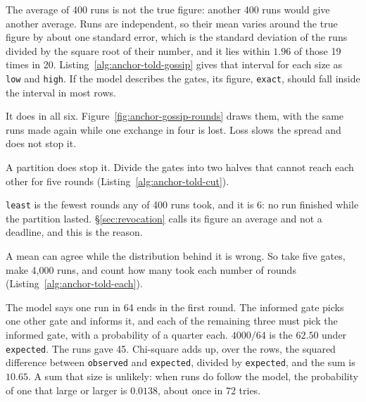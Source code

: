 The average of 400 runs is not the true figure: another 400 runs would
give another average. Runs are independent, so their mean varies around
the true figure by about one standard error, which is the standard
deviation of the runs divided by the square root of their number, and it
lies within $1.96$ of those 19 times in 20.
Listing~\ref{alg:anchor-told-gossip}
gives that interval for each size as \texttt{low} and \texttt{high}. If the
model describes the gates, its figure, \texttt{exact}, should fall inside
the interval in most rows.


It does in all six. Figure~\ref{fig:anchor-gossip-rounds} draws them,
with the same runs made again while one exchange in four is lost. Loss
slows the spread and does not stop it.



A partition does stop it. Divide the gates into two halves that cannot
reach each other for five rounds (Listing~\ref{alg:anchor-told-cut}).


\texttt{least} is the fewest rounds any of 400 runs took, and it is 6:
no run finished while the partition lasted. \S\ref{sec:revocation} calls
its figure an average and not a deadline, and this is the reason.

A mean can agree while the distribution behind it is wrong. So take five
gates, make 4{,}000 runs, and count how many took each number of rounds
(Listing~\ref{alg:anchor-told-each}).


The model says one run in 64 ends in the first round. The informed gate
picks one other gate and informs it, and each of the remaining three must
pick the informed gate, with a probability of a quarter each. $4000/64$ is
the $62.50$ under \texttt{expected}. The runs gave 45. Chi-square adds up,
over the rows, the squared difference between \texttt{observed} and
\texttt{expected}, divided by \texttt{expected}, and the sum is $10.65$. A
sum that size is unlikely: when runs do follow the model, the probability
of one that large or larger is $0.0138$, about once in 72 tries.

